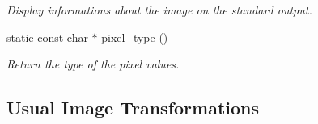 \begin{DoxyCompactItemize}
\begin{DoxyCompactList}\small\item\em Display informations about the image on the standard output. \end{DoxyCompactList}\item 
static const char $\ast$ \hyperlink{structcimg__library_1_1_c_img_a40381e3f35687e554852725b13eb4fa9}{pixel\-\_\-type} ()
\begin{DoxyCompactList}\small\item\em Return the type of the pixel values. \end{DoxyCompactList}\end{DoxyCompactItemize}
\subsection*{Usual Image Transformations}
